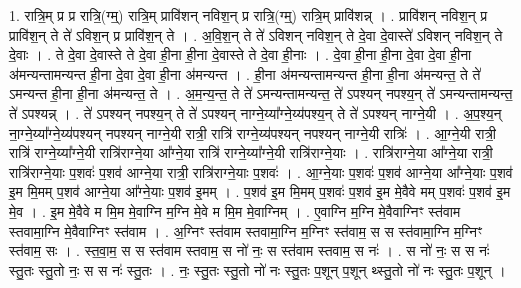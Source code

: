 \documentclass[17pt]{extarticle}
\begin{document}
1. रात्रि॒म् प्र प्र रात्रि॒(ग्म्॒) रात्रि॒म् प्रावि॑शन् नविश॒न् प्र रात्रि॒(ग्म्॒) रात्रि॒म् प्रावि॑शन्न् । . प्रावि॑शन् नविश॒न् प्र प्रावि॑श॒न् ते ते॑ ऽविश॒न् प्र प्रावि॑श॒न् ते । . अ॒वि॒श॒न् ते ते॑ ऽविशन् नविश॒न् ते दे॒वा दे॒वास्ते॑ ऽविशन् नविश॒न् ते दे॒वाः । . ते दे॒वा दे॒वास्ते ते दे॒वा ही॒ना ही॒ना दे॒वास्ते ते दे॒वा ही॒नाः । . दे॒वा ही॒ना ही॒ना दे॒वा दे॒वा ही॒ना अ॑मन्यन्तामन्यन्त ही॒ना दे॒वा दे॒वा ही॒ना अ॑मन्यन्त । . ही॒ना अ॑मन्यन्तामन्यन्त ही॒ना ही॒ना अ॑मन्यन्त॒ ते ते॑ ऽमन्यन्त ही॒ना ही॒ना अ॑मन्यन्त॒ ते । . अ॒म॒न्य॒न्त॒ ते ते॑ ऽमन्यन्तामन्यन्त॒ ते॑ ऽपश्यन् नपश्य॒न् ते॑ ऽमन्यन्तामन्यन्त॒ ते॑ ऽपश्यन्न् । . ते॑ ऽपश्यन् नपश्य॒न् ते ते॑ ऽपश्यन् नाग्ने॒य्या᳚ग्ने॒य्य॑पश्य॒न् ते ते॑ ऽपश्यन् नाग्ने॒यी । . अ॒प॒श्य॒न् ना॒ग्ने॒य्या᳚ग्ने॒य्य॑पश्यन् नपश्यन् नाग्ने॒यी रात्री॒ रात्रि॑ राग्ने॒य्य॑पश्यन् नपश्यन् नाग्ने॒यी रात्रिः॑ । . आ॒ग्ने॒यी रात्री॒ रात्रि॑ राग्ने॒य्या᳚ग्ने॒यी रात्रि॑राग्ने॒या आ᳚ग्ने॒या रात्रि॑ राग्ने॒य्या᳚ग्ने॒यी रात्रि॑राग्ने॒याः । . रात्रि॑राग्ने॒या आ᳚ग्ने॒या रात्री॒ रात्रि॑राग्ने॒याः प॒शवः॑ प॒शव॑ आग्ने॒या रात्री॒ रात्रि॑राग्ने॒याः प॒शवः॑ । . आ॒ग्ने॒याः प॒शवः॑ प॒शव॑ आग्ने॒या आ᳚ग्ने॒याः प॒शव॑ इ॒म मि॒मम् प॒शव॑ आग्ने॒या आ᳚ग्ने॒याः प॒शव॑ इ॒मम् । . प॒शव॑ इ॒म मि॒मम् प॒शवः॑ प॒शव॑ इ॒म मे॒वैवे मम् प॒शवः॑ प॒शव॑ इ॒म मे॒व । . इ॒म मे॒वैवे म मि॒म मे॒वाग्नि म॒ग्नि मे॒वे म मि॒म मे॒वाग्निम् । . ए॒वाग्नि म॒ग्नि मे॒वैवाग्निꣳ स्त॑वाम स्तवामा॒ग्नि मे॒वैवाग्निꣳ स्त॑वाम । . अ॒ग्निꣳ स्त॑वाम स्तवामा॒ग्नि म॒ग्निꣳ स्त॑वाम॒ स स स्त॑वामा॒ग्नि म॒ग्निꣳ स्त॑वाम॒ सः । . स्त॒वा॒म॒ स स स्त॑वाम स्तवाम॒ स नो॑ नः॒ स स्त॑वाम स्तवाम॒ स नः॑ । . स नो॑ नः॒ स स नः॑ स्तु॒तः स्तु॒तो नः॒ स स नः॑ स्तु॒तः । . नः॒ स्तु॒तः स्तु॒तो नो॑ नः स्तु॒तः प॒शून् प॒शून् थ्स्तु॒तो नो॑ नः स्तु॒तः प॒शून् । \newline
\end{document}
